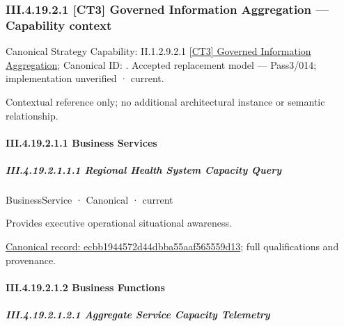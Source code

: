 \subsubsection*{III.4.19.2.1 [CT3] Governed Information Aggregation — Capability context}
\label{navigation:III.4.19.2.1}

{\small Canonical Strategy Capability: II.1.2.9.2.1 \hyperref[element:97909bca83fd4ece8d35e64243923b9d]{[CT3] Governed Information Aggregation}; Canonical ID: \texttt{}. Accepted replacement model — Pass3/014; implementation unverified · current.}\par
Contextual reference only; no additional architectural instance or semantic relationship.\par
\paragraph*{III.4.19.2.1.1 Business Services}
\label{navigation:III.4.19.2.1.1}

\subparagraph*{III.4.19.2.1.1.1 Regional Health System Capacity Query}
\label{navigation:III.4.19.2.1.1.1}

\label{element:ecbb1944572d44dbba55aaf565559d13}
{\small BusinessService · Canonical · current}\par

Provides executive operational situational awareness.


{\footnotesize \href{../../../../../../../continuum/business/business-service/ecbb1944572d44dbba55aaf565559d13.md}{Canonical record: ecbb1944572d44dbba55aaf565559d13}; full qualifications and provenance.}\par
\paragraph*{III.4.19.2.1.2 Business Functions}
\label{navigation:III.4.19.2.1.2}

\subparagraph*{III.4.19.2.1.2.1 Aggregate Service Capacity Telemetry}
\label{navigation:III.4.19.2.1.2.1}

